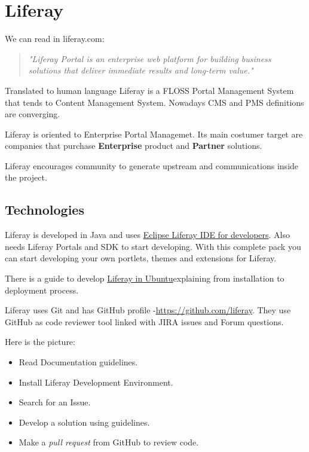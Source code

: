 \section{Liferay}
\label{sec:liferay}

We can read in liferay.com:
\begin{quote}
    \textit{"Liferay Portal is an enterprise web platform for building business solutions that deliver immediate results and long-term value."}
\end{quote}

\par Translated to human language Liferay is a FLOSS Portal Management System that tends to Content Management System. Nowadays CMS and PMS definitions are converging.

\par Liferay is oriented to Enterprise Portal Managemet. Its main costumer target are companies that purchase \textbf{Enterprise} product and \textbf{Partner} solutions.

\par Liferay encourages community to generate upstream and communications inside the project.

\subsection{Technologies}

\par Liferay is developed in Java and uses \href{http://sourceforge.net/projects/lportal/files/Liferay\%20IDE/1.4.0/liferay-ide-eclipse-updatesite-1.4.0.zip/download}{Eclipse Liferay IDE for developers}. Also needs Liferay Portals and SDK to start developing. With this complete pack you can start developing your own portlets, themes and extensions for Liferay.

\par There is a guide to develop \href{http://www.liferay.com/community/wiki/-/wiki/Main/Liferay+6.0+Development+on+Ubuntu+Maverick+10.10}{Liferay in Ubuntu}explaining from installation to deployment process.

\par Liferay uses Git and has GitHub profile -\url{https://github.com/liferay}. They use GitHub as code reviewer tool linked with JIRA issues and Forum questions.
\par Here is the picture:
\begin{itemize}
	\item Read Documentation guidelines.
	\item Install Liferay Development Environment.
	\item Search for an Issue.
	\item Develop a solution using guidelines.
	\item Make a \textit{pull request} from GitHub to review code.
\end{itemize}

